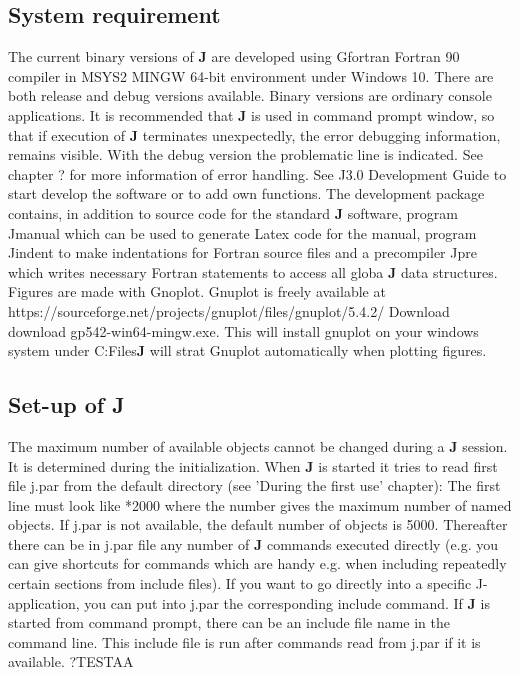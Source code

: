 \subsection{System requirement}
\label{system}
The current binary versions of \textbf{J} are developed using Gfortran Fortran 90 compiler in MSYS2 MINGW 64-bit environment
under Windows 10. There are both release and debug versions available.
Binary versions are ordinary console applications. It is recommended that \textbf{J} is used in command
prompt window, so that
if execution of \textbf{J} terminates unexpectedly, the error debugging information, remains visible.
With the debug version the problematic line is indicated.
See chapter ? for more information of error handling.
See J3.0 Development Guide to start develop the software or to add
own functions. The development package contains, in addition to source code for
the standard \textbf{J} software, program Jmanual
which can be used to generate Latex code for the manual, program Jindent to make indentations for
Fortran source files and
a precompiler Jpre which writes necessary Fortran statements to access all globa \textbf{J} data structures.
Figures are made with Gnoplot.
Gnuplot is freely available at
https://sourceforge.net/projects/gnuplot/files/gnuplot/5.4.2/
Download  download gp542-win64-mingw.exe. This will install gnuplot on your windows
system under C:\Program Files\gnuplot\. \textbf{J} will strat Gnuplot automatically when
plotting figures.
\subsection{Set-up of \textbf{J}}
\label{setup}
The maximum number of available objects cannot be changed during a \textbf{J} session. It is determined during
the initialization. When \textbf{J} is started it tries to read first file j.par from the default directory
(see 'During the first use' chapter): The first line must look like
*2000
where the number gives the maximum number of named objects.  If j.par is not available, the default
number of objects is 5000.
Thereafter there can be in j.par file any number of \textbf{J} commands executed directly (e.g.
you can give shortcuts for
commands which are handy e.g. when including repeatedly certain sections from include files). If you
want to go directly into a specific J-application, you can put into j.par the corresponding include
command.
If \textbf{J} is started from command prompt, there can be an include file name in the command line. This
include file is run after commands read from j.par if it is available.  ?TESTAA
